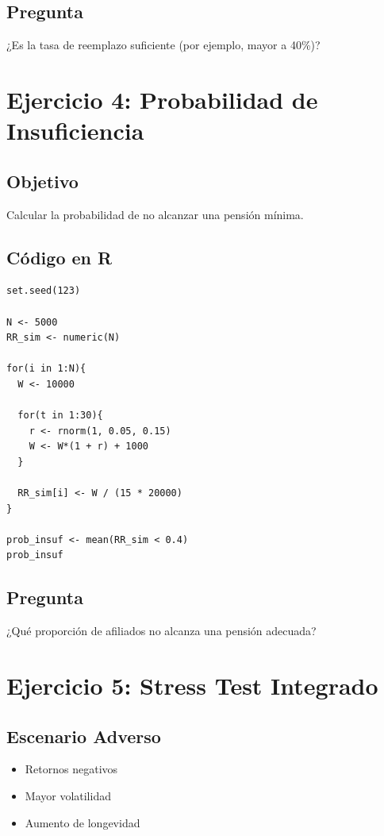 \documentclass[12pt]{article}
\begin{document}
\subsection{Pregunta}
¿Es la tasa de reemplazo suficiente (por ejemplo, mayor a 40\%)?

\section{Ejercicio 4: Probabilidad de Insuficiencia}

\subsection{Objetivo}
Calcular la probabilidad de no alcanzar una pensión mínima.

\subsection{Código en R}
\begin{verbatim}
set.seed(123)

N <- 5000
RR_sim <- numeric(N)

for(i in 1:N){
  W <- 10000
  
  for(t in 1:30){
    r <- rnorm(1, 0.05, 0.15)
    W <- W*(1 + r) + 1000
  }
  
  RR_sim[i] <- W / (15 * 20000)
}

prob_insuf <- mean(RR_sim < 0.4)
prob_insuf
\end{verbatim}

\subsection{Pregunta}
¿Qué proporción de afiliados no alcanza una pensión adecuada?

\section{Ejercicio 5: Stress Test Integrado}

\subsection{Escenario Adverso}
\begin{itemize}
\item Retornos negativos
\item Mayor volatilidad
\item Aumento de longevidad
\end{itemize}
\end{document}
